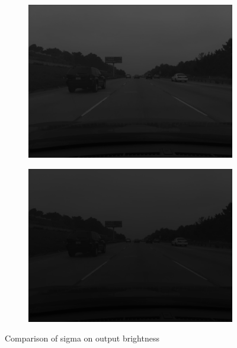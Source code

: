 \documentclass[12pt,a4paper]{report}
\begin{document}
\begin{figure}[!htb]
\begin{minipage}{\linewidth}
    \begin{subfigure}{0.49\textwidth}
      \includegraphics[width=\linewidth]{output/img2_q1_K3_SIG_1.5.png}
    \end{subfigure}
    \begin{subfigure}{0.49\textwidth}
      \includegraphics[width=\linewidth]{output/img2_q1_K3_SIG_2.0.png}
    \end{subfigure}

    \caption{Comparison of sigma on output brightness}
  \end{minipage}

\end{figure}
\end{document}
